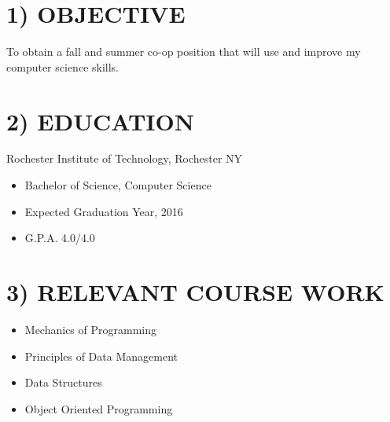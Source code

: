 \documentclass{res}
\begin{document}
                                 
\begin{resume}

\section{1) OBJECTIVE}          
    To obtain a fall and summer co-op position that will use and improve my computer science skills.
 
\section{2) EDUCATION}          
	
	    Rochester Institute of Technology, Rochester NY
      \begin{itemize}
          \item Bachelor of Science, Computer Science
	        \item Expected Graduation Year, 2016
	        \item G.P.A. 4.0/4.0
      \end{itemize}
      \vspace{-.1in}

\section{3) RELEVANT COURSE WORK}
    \begin{itemize}
      \item Mechanics of Programming
      \item Principles of Data Management
      \item Data Structures 
      \item Object Oriented Programming
    \end{itemize}

 

\end{resume}
\end{document}
